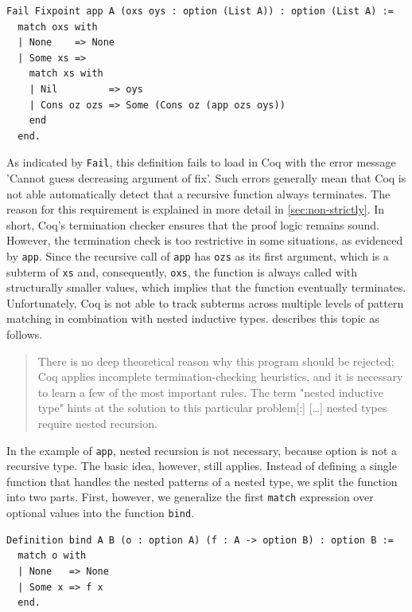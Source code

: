 \documentclass[a4paper, 11pt, fleqn, twoside, abstract=on]{scrreprt}
\newcommand{\cinl}[1]{\texttt{#1}}
\begin{document}
\begin{verbatim}
Fail Fixpoint app A (oxs oys : option (List A)) : option (List A) :=
  match oxs with
  | None    => None
  | Some xs =>
    match xs with
    | Nil         => oys
    | Cons oz ozs => Some (Cons oz (app ozs oys))
    end
  end.
\end{verbatim}

As indicated by \cinl{Fail}, this definition fails to load in Coq with the error message 'Cannot guess decreasing argument of fix'.
Such errors generally mean that Coq is not able automatically detect that a recursive function always terminates.
The reason for this requirement is explained in more detail in \autoref{sec:non-strictly}.
In short, Coq's termination checker ensures that the proof logic remains sound.
However, the termination check is too restrictive in some situations, as evidenced by \cinl{app}.
Since the recursive call of \cinl{app} has \cinl{ozs} as its first argument, which is a subterm of \cinl{xs} and, consequently, \cinl{oxs}, the function is always called with structurally smaller values, which implies that the function eventually terminates.
Unfortunately, Coq is not able to track subterms across multiple levels of pattern matching in combination with nested inductive types. \citet{chlipala2013certified} describes this topic as follows.

\begin{quotation}
\noindent
There is no deep theoretical reason why this program should be rejected; Coq applies incomplete termination-checking heuristics, and it is necessary to learn a few of the most important rules. The term "nested inductive type" hints at the solution to this particular problem[:] [\dots{}] nested types require nested recursion.
\end{quotation}

In the example of \cinl{app}, nested recursion is not necessary, because option is not a recursive type.
The basic idea, however, still applies.
Instead of defining a single function that handles the nested patterns of a nested type, we split the function into two parts.
First, however, we generalize the first \cinl{match} expression over optional values into the function \cinl{bind}.

\begin{verbatim}
Definition bind A B (o : option A) (f : A -> option B) : option B :=
  match o with
  | None   => None
  | Some x => f x
  end.
\end{verbatim}
\end{document}

